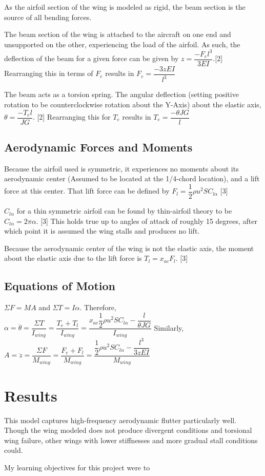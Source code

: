 \documentclass[]{article}
\begin{document}
As the airfoil section of the wing is modeled as rigid, the beam section is the source of all bending forces. 

The beam section of the wing is attached to the aircraft on one end and unsupported on the other, experiencing the load of the airfoil. As such, the deflection of the beam for a given force  can be given by $z = \dfrac{-{F_e} l^3}{3EI}$.[2] Rearranging this in terms of $F_e$ results in $F_e = \dfrac{ -3zEI}{l^3}$

The beam acts as a torsion spring. The angular deflection (setting positive rotation to be counterclockwise rotation about the Y-Axis) about the elastic axis, $\theta = \dfrac{- T_e l}{JG}$. [2] Rearranging this for $T_e$ results in $T_e = \dfrac{-\theta JG}{l}$


\subsection{Aerodynamic Forces and Moments}

Because the airfoil used is symmetric, it experiences no moments about its aerodynamic center (Assumed to be located at the 1/4-chord location), and a lift force at this center. That lift force can be defined by $F_l = \dfrac{1}{2} \rho u^2 S C_{l\alpha}$ [3]

$C_{l\alpha}$ for a thin symmetric airfoil can be found by thin-airfoil theory to be $C_{l\alpha} = 2 \pi \alpha $. [3] This holds true up to angles of attack of roughly 15 degrees, after which point it is assumed the wing stalls and produces no lift.

Because the aerodynamic center of the wing is not the elastic axis, the moment about the elastic axis due to the lift force is $T_l = x_{ac} F_l$. [3]


\subsection{Equations of Motion}

 $\Sigma F = MA$ and $\Sigma T = I \alpha$.
 Therefore, $\alpha = \ddot{\theta} = \dfrac{\Sigma T}{I_{wing}} = \dfrac{T_e+T_l}{I_{wing}} = \dfrac{x_{ac} \dfrac{1}{2} \rho u^2 S C_{l\alpha} - \dfrac{l}{\theta JG}}{I_{wing}}$
 Similarly, $A = \ddot{z} = \dfrac{\Sigma F }{M_{wing}} = \dfrac{F_e+F_l}{M_{wing}} = \dfrac{\dfrac{1}{2} \rho u^2 S C_{l\alpha}-\dfrac{l^3}{3zEI}}{M_{wing}}$
 
 

\section{Results}

This model captures high-frequency aerodynamic flutter particularly well. Though the wing modeled does not produce divergent conditions and torsional wing failure, other wings with lower stiffnesses and more gradual stall conditions could. 

My learning objectives for this project were to 
\end{document}
